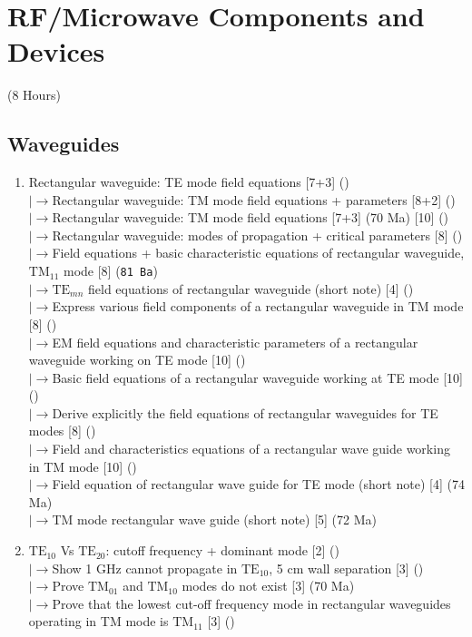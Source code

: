 \documentclass[12pt]{article}
\newcommand{\lb}{\\$\left|\rightarrow\right.$}
\begin{document}
\pagebreak
\section{RF/Microwave Components and Devices}
\begin{center}(8 Hours)\end{center}

  \subsection{Waveguides}
    \begin{enumerate}[topsep=0pt, noitemsep]
      \item Rectangular waveguide: TE mode field equations \hfill [7+3] ()
        \lb Rectangular waveguide: TM mode field equations + parameters \hfill [8+2] ()
        \lb Rectangular waveguide: TM mode field equations \hfill [7+3] (70 Ma) [10] ()
        \lb Rectangular waveguide: modes of propagation + critical parameters \hfill [8] ()
        \lb Field equations + basic characteristic equations of rectangular waveguide, $\text{TM}_{11}$ mode \hfill [8] (\texttt{81 Ba})
        \lb $\text{TE}_{mn}$ field equations of rectangular waveguide (short note) \hfill [4] ()
        \lb Express various field components of a rectangular waveguide in TM mode \hfill [8] ()
        \lb EM field equations and characteristic parameters of a rectangular waveguide working on TE mode \hfill [10] ()
        \lb Basic field equations of a rectangular waveguide working at TE mode \hfill [10] ()
        \lb Derive explicitly the field equations of rectangular waveguides for TE modes \hfill [8] ()
        \lb Field and characteristics equations of a rectangular wave guide working in TM mode \hfill [10] ()
        \lb Field equation of rectangular wave guide for TE mode (short note) \hfill [4] (74 Ma)
        \lb TM mode rectangular wave guide (short note) \hfill [5] (72 Ma)
      \item $\text{TE}_{10}$ Vs $\text{TE}_{20}$: cutoff frequency + dominant mode \hfill [2] ()
        \lb Show 1 GHz cannot propagate in $\text{TE}_{10}$, 5 cm wall separation \hfill [3] ()
        \lb Prove $\text{TM}_{01}$ and $\text{TM}_{10}$ modes do not exist \hfill [3] (70 Ma)
        \lb Prove that the lowest cut-off frequency mode in rectangular waveguides operating in TM mode is $\text{TM}_{11}$ \hfill [3] ()

\end{enumerate}
\end{document}
